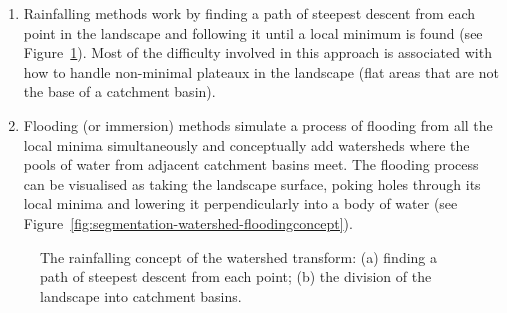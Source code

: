 \documentclass[review,a4paper]{elsarticle}
\newenvironment{stusubfig}[1]
{
	\begin{figure}[#1]
	\begin{center}
}
{
	\end{center}
	\end{figure}
}
\begin{document}
\begin{enumerate}

\item Rainfalling methods \cite{meijster98,osma-ruiz06,stoev00} work by finding a path of steepest descent from each point in the landscape and following it until a local minimum is found (see Figure~\ref{fig:segmentation-watershed-rainfallingconcept}). Most of the difficulty involved in this approach is associated with how to handle non-minimal plateaux in the landscape (flat areas that are not the base of a catchment basin).

\item Flooding (or immersion) methods \cite{bieniek00,rambabu07} simulate a process of flooding from all the local minima simultaneously and conceptually add watersheds where the pools of water from adjacent catchment basins meet. The flooding process can be visualised as taking the landscape surface, poking holes through its local minima and lowering it perpendicularly into a body of water (see Figure~\ref{fig:segmentation-watershed-floodingconcept}).

\end{enumerate}

\begin{stusubfig}{p}
	\hspace{4mm}%
\caption{The rainfalling concept of the watershed transform: (a) finding a path of steepest descent from each point; (b) the division of the landscape into catchment basins.}
\label{fig:segmentation-watershed-rainfallingconcept}
\end{stusubfig}
\end{document}

